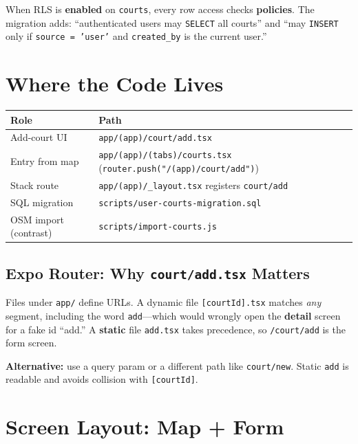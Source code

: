 \documentclass[11pt,a4paper]{article}
\begin{document}
When RLS is \textbf{enabled} on \texttt{courts}, every row access checks \textbf{policies}. The migration adds: ``authenticated users may \texttt{SELECT} all courts'' and ``may \texttt{INSERT} only if \texttt{source = 'user'} and \texttt{created\_by} is the current user.''

\section{Where the Code Lives}

\begin{tabular}{@{}ll@{}}
\toprule
\textbf{Role} & \textbf{Path} \\
\midrule
Add-court UI & \texttt{app/(app)/court/add.tsx} \\
Entry from map & \texttt{app/(app)/(tabs)/courts.tsx} (\texttt{router.push("/(app)/court/add")}) \\
Stack route & \texttt{app/(app)/\_layout.tsx} registers \texttt{court/add} \\
SQL migration & \texttt{scripts/user-courts-migration.sql} \\
OSM import (contrast) & \texttt{scripts/import-courts.js} \\
\bottomrule
\end{tabular}

\subsection{Expo Router: Why \texttt{court/add.tsx} Matters}

Files under \texttt{app/} define URLs. A dynamic file \texttt{[courtId].tsx} matches \emph{any} segment, including the word \texttt{add}---which would wrongly open the \textbf{detail} screen for a fake id ``add.'' A \textbf{static} file \texttt{add.tsx} takes precedence, so \texttt{/court/add} is the form screen.

\textbf{Alternative:} use a query param or a different path like \texttt{court/new}. Static \texttt{add} is readable and avoids collision with \texttt{[courtId]}.

\section{Screen Layout: Map + Form}
\end{document}
